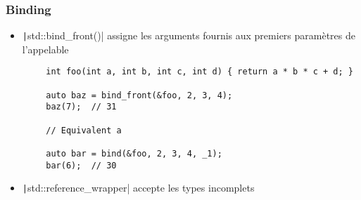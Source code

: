 \documentclass[C++.tex]{subfiles}
\begin{document}
\begin{frame}[fragile]
	\frametitle{Binding}
	\begin{itemize}
		\item \texttt|std::bind_front()| assigne les arguments fournis aux premiers paramètres de l'appelable
	\end{itemize}

	\begin{verbatim}
		int foo(int a, int b, int c, int d) { return a * b * c + d; }

		auto baz = bind_front(&foo, 2, 3, 4);
		baz(7);  // 31

		// Equivalent a

		auto bar = bind(&foo, 2, 3, 4, _1);
		bar(6);  // 30
	\end{verbatim}

	\begin{itemize}
		\item \texttt|std::reference_wrapper| accepte les types incomplets

	\end{itemize}


\end{frame}
\end{document}
